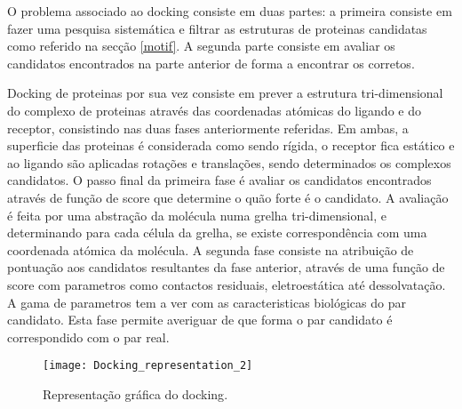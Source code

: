O problema associado ao docking consiste em duas partes: a primeira consiste em fazer uma pesquisa sistemática e filtrar as estruturas de proteinas candidatas como referido na secção \ref{motif}. A segunda parte consiste em avaliar os candidatos encontrados na parte anterior de forma a encontrar os corretos\cite{prediction}. \par
 Docking de proteinas por sua vez consiste em prever a estrutura tri-dimensional do complexo de proteinas através das coordenadas atómicas do ligando e do receptor, consistindo nas duas fases anteriormente referidas. Em ambas, a superficie das proteinas é considerada como sendo rígida, o receptor fica estático e ao ligando são aplicadas rotações e translações, sendo determinados os complexos candidatos. O passo final da primeira fase é avaliar os candidatos encontrados através de função de score que determine o quão forte é o candidato. A avaliação é feita por uma abstração da molécula numa grelha tri-dimensional, e determinando para cada célula da grelha, se existe correspondência com uma coordenada atómica da molécula. A segunda fase consiste na atribuição de pontuação aos candidatos resultantes da fase anterior, através de uma função de score com parametros como contactos residuais, eletroestática até dessolvatação. A gama de parametros tem a ver com as caracteristicas biológicas do par candidato. Esta fase permite averiguar de que forma o par candidato é correspondido com o par real\cite{bigger2016}.
\begin{figure}[ht]
  \centering
    {\texttt{[image: Docking\_representation\_2]}}
  \caption{Representação gráfica do docking\cite{dockingWiki}.}
  \label{dockGraf}
\end{figure}

